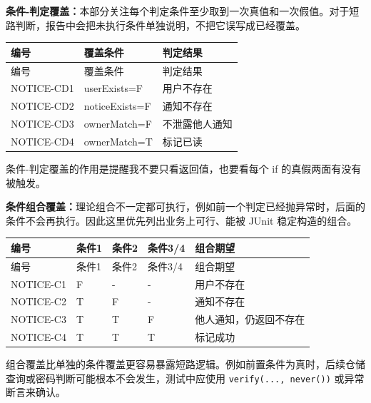 \documentclass[bwprint]{report}
\begin{document}
\textbf{条件-判定覆盖：}本部分关注每个判定条件至少取到一次真值和一次假值。对于短路判断，报告中会把未执行条件单独说明，不把它误写成已经覆盖。
{
\setlength{\tabcolsep}{3pt}
\begin{longtable}{P{2.4cm}P{5.0cm}P{5.8cm}}
\toprule
编号 & 覆盖条件 & 判定结果\\
\midrule
\endfirsthead
\toprule
编号 & 覆盖条件 & 判定结果\\
\midrule
\endhead
NOTICE-\hspace{0pt}CD1 & user\hspace{0pt}Exists=\hspace{0pt}F & 用户不存在 \\
NOTICE-\hspace{0pt}CD2 & notice\hspace{0pt}Exists=\hspace{0pt}F & 通知不存在 \\
NOTICE-\hspace{0pt}CD3 & owner\hspace{0pt}Match=\hspace{0pt}F & 不泄露他人通知 \\
NOTICE-\hspace{0pt}CD4 & owner\hspace{0pt}Match=\hspace{0pt}T & 标记已读 \\
\bottomrule
\end{longtable}
}
条件-判定覆盖的作用是提醒我不要只看返回值，也要看每个 if 的真假两面有没有被触发。

\textbf{条件组合覆盖：}理论组合不一定都可执行，例如前一个判定已经抛异常时，后面的条件不会再执行。因此这里优先列出业务上可行、能被 JUnit 稳定构造的组合。
{
\setlength{\tabcolsep}{3pt}
\begin{longtable}{P{2.4cm}P{2.0cm}P{2.0cm}P{2.0cm}P{4.1cm}}
\toprule
编号 & 条件1 & 条件2 & 条件3/4 & 组合期望\\
\midrule
\endfirsthead
\toprule
编号 & 条件1 & 条件2 & 条件3/4 & 组合期望\\
\midrule
\endhead
NOTICE-\hspace{0pt}C1 & F & - & - & 用户不存在 \\
NOTICE-\hspace{0pt}C2 & T & F & - & 通知不存在 \\
NOTICE-\hspace{0pt}C3 & T & T & F & 他人通知，仍返回不存在 \\
NOTICE-\hspace{0pt}C4 & T & T & T & 标记成功 \\
\bottomrule
\end{longtable}
}
组合覆盖比单独的条件覆盖更容易暴露短路逻辑。例如前置条件为真时，后续仓储查询或密码判断可能根本不会发生，测试中应使用 \texttt{verify(..., never())} 或异常断言来确认。
\end{document}

